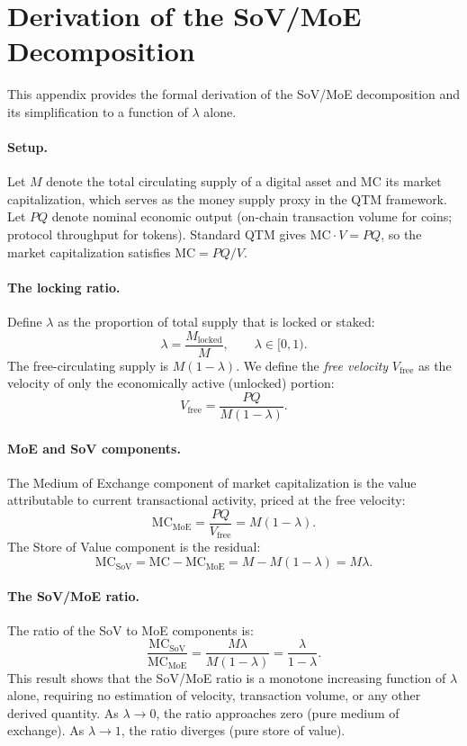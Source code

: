 \documentclass[12pt]{article}
\begin{document}
\appendix
\section{Derivation of the SoV/MoE Decomposition}
\label{app:derivations}

This appendix provides the formal derivation of the SoV/MoE decomposition and its
simplification to a function of $\lambda$ alone.

\paragraph{Setup.} Let $M$ denote the total circulating supply of a digital asset and
$\text{MC}$ its market capitalization, which serves as the money supply proxy in the
QTM framework. Let $PQ$ denote nominal economic output (on-chain transaction volume for
coins; protocol throughput for tokens). Standard QTM gives $\text{MC} \cdot V = PQ$,
so the market capitalization satisfies $\text{MC} = PQ / V$.

\paragraph{The locking ratio.} Define $\lambda$ as the proportion of total supply that
is locked or staked:
\[
\lambda = \frac{M_{\text{locked}}}{M}, \qquad \lambda \in [0,1).
\]
The free-circulating supply is $M(1-\lambda)$. We define the \textit{free velocity}
$V_{\text{free}}$ as the velocity of only the economically active (unlocked) portion:
\[
V_{\text{free}} = \frac{PQ}{M(1-\lambda)}.
\]

\paragraph{MoE and SoV components.} The Medium of Exchange component of market
capitalization is the value attributable to current transactional activity, priced at
the free velocity:
\[
\text{MC}_{\text{MoE}} = \frac{PQ}{V_{\text{free}}} = M(1-\lambda).
\]
The Store of Value component is the residual:
\[
\text{MC}_{\text{SoV}} = \text{MC} - \text{MC}_{\text{MoE}} = M - M(1-\lambda) = M\lambda.
\]

\paragraph{The SoV/MoE ratio.} The ratio of the SoV to MoE components is:
\[
\frac{\text{MC}_{\text{SoV}}}{\text{MC}_{\text{MoE}}} = \frac{M\lambda}{M(1-\lambda)}
= \frac{\lambda}{1-\lambda}.
\]
This result shows that the SoV/MoE ratio is a monotone increasing function of $\lambda$
alone, requiring no estimation of velocity, transaction volume, or any other derived
quantity. As $\lambda \to 0$, the ratio approaches zero (pure medium of exchange). As
$\lambda \to 1$, the ratio diverges (pure store of value).
\end{document}

